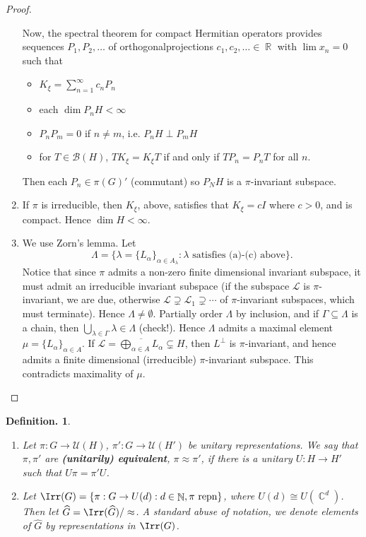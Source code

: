 \documentclass[11pt, a4paper]{memoir}
\DeclareMathOperator{\N}{{\mathbb{N}}}
\DeclareMathOperator{\R}{{\mathbb{R}}}
\DeclareMathOperator{\C}{{\mathbb{C}}}
\theoremstyle{change}
\theoremstyle{plain}
\theoremstyle{nonumberplain}
\newtheorem{definition}{Definition.}
\newtheorem{proof}{Proof}
\newcommand{\defn}[1]{{\boldmath\bfseries #1}}
\numberwithin{equation}{section}
\begin{document}
\begin{proof}
\begin{enumerate}[r]
            Now, the spectral theorem for compact Hermitian operators provides sequences $P_1,P_2,\ldots$ of orthogonalprojections $c_1,c_2,\ldots\in\R$ with $\lim x_n=0$ such that
            \begin{itemize}[nl]
                \item $K_\xi=\sum_{n=1}^\infty c_nP_n$
                \item each $\dim P_nH<\infty$
                \item $P_nP_m=0$ if $n\neq m$, i.e. $P_nH\perp P_mH$
                \item for $T\in \mathcal{B}(H)$, $TK_\xi=K_\xi T$ if and only if $TP_n=P_nT$ for all $n$.
            \end{itemize}
            Then each $P_n\in\pi(G)'$ (commutant) so $P_NH$ is a $\pi$-invariant subspace.
        \item If $\pi$ is irreducible, then $K_\xi$, above, satisfies that $K_\xi=cI$ where $c>0$, and is compact.
            Hence $\dim H<\infty$.
        \item We use Zorn's lemma.
            Let
            \begin{equation*}
                \Lambda=\{\lambda=\{L_\alpha\}_{\alpha\in A_\lambda}:\lambda\text{ satisfies (a)-(c) above}\}.
            \end{equation*}
            Notice that since $\pi$ admits a non-zero finite dimensional invariant subspace, it must admit an irreducible invariant subspace (if the subspace $\mathcal{L}$ is $\pi$-invariant, we are due, otherwise $\mathcal{L}\supsetneq\mathcal{L}_1\supsetneq\cdots$ of $\pi$-invariant subspaces, which must terminate).
            Hence $\Lambda\neq\emptyset$.
            Partially order $\Lambda$ by inclusion, and if $\Gamma\subseteq\Lambda$ is a chain, then $\bigcup_{\lambda\in\Gamma}\lambda\in\Lambda$ (check!).
            Hence $\Lambda$ admits a maximal element $\mu=\{L_\alpha\}_{\alpha\in A}$.
            If $\mathcal{L}=\overline{\bigoplus_{\alpha\in A}L_\alpha}\subsetneq H$, then $L^\perp$ is $\pi$-invariant, and hence admits a finite dimensional (irreducible) $\pi$-invariant subspace.
            This contradicts maximality of $\mu$.
    \end{enumerate}
\end{proof}
\begin{definition}
    \begin{enumerate}[nl,r]
        \item Let $\pi:G\to \mathcal{U}(H)$, $\pi':G\to\mathcal{U}(H')$ be unitary representations.
            We say that $\pi,\pi'$ are \defn{(unitarily) equivalent}, $\pi\approx\pi'$, if there is a unitary $U:H\to H'$ such that $U\pi=\pi'U$.
        \item Let $\Irr(G)=\{\pi:G\to U(d):d\in\N,\pi\text{ repn}\}$, where $U(d)\cong U(\C^d)$.
            Then let $\widehat{G}=\Irr(\widehat{G})/\approx$.
            A standard abuse of notation, we denote elements of $\widehat{G}$ by representations in $\Irr(G)$.
    \end{enumerate}
\end{definition}
\end{document}
